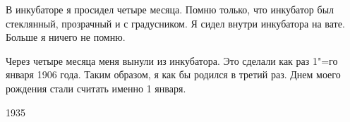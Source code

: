 В инкубаторе я просидел четыре месяца. Помню только, что инкубатор был стеклянный, прозрачный и с градусником. Я сидел внутри инкубатора на вате. Больше я ничего не помню.

Через четыре месяца меня вынули из инкубатора. Это сделали как раз 1"=го января 1906 года. Таким образом, я как бы родился в третий раз. Днем моего рождения стали считать именно 1 января.

\begin{flushright}                    1935\end{flushright}  
